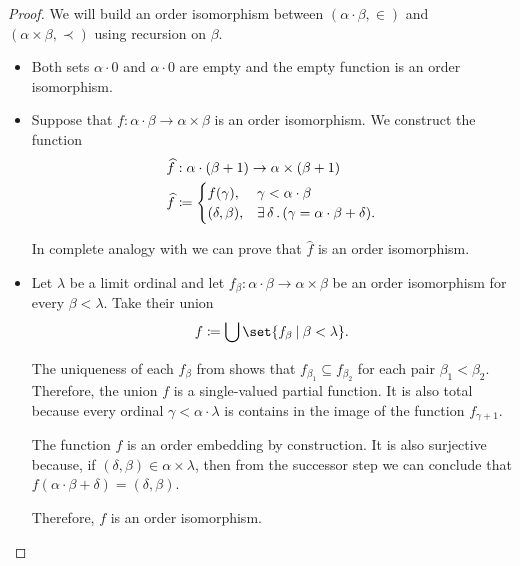 \begin{proof}
  We will build an order isomorphism between \( (\alpha \cdot \beta, \in) \) and \( (\alpha \times \beta, \prec) \) using recursion on \( \beta \).
  \begin{itemize}
    \item Both sets \( \alpha \cdot 0 \) and \( \alpha \cdot 0 \) are empty and the empty function is an order isomorphism.
    \item Suppose that \( f: \alpha \cdot \beta \to \alpha \times \beta \) is an order isomorphism. We construct the function
    \begin{equation*}
      \begin{aligned}
        &\widehat f: \alpha \cdot (\beta + 1) \to \alpha \times (\beta + 1) \\
        &\widehat f \coloneqq \begin{cases}
          f(\gamma),       &\gamma < \alpha \cdot \beta \\
          (\delta, \beta), &\exists \thinspace \delta \thinspace . \thinspace (\gamma = \alpha \cdot \beta + \delta).
        \end{cases}
      \end{aligned}
    \end{equation*}

    In complete analogy with  we can prove that \( \widehat f \) is an order isomorphism.

    \item Let \( \lambda \) be a limit ordinal and let \( f_\beta: \alpha \cdot \beta \to \alpha \times \beta \) be an order isomorphism for every \( \beta < \lambda \). Take their union
    \begin{equation*}
      f \coloneqq \bigcup\set{ f_\beta \given \beta < \lambda }.
    \end{equation*}

    The uniqueness of each \( f_\beta \) from  shows that \( f_{\beta_1} \subseteq f_{\beta_2} \) for each pair \( \beta_1 < \beta_2 \). Therefore, the union \( f \) is a single-valued partial function. It is also total because every ordinal \( \gamma < \alpha \cdot \lambda \) is contains in the image of the function \( f_{\gamma + 1} \).

    The function \( f \) is an order embedding by construction. It is also surjective because, if \( (\delta, \beta) \in \alpha \times \lambda \), then from the successor step we can conclude that \( f(\alpha \cdot \beta + \delta) = (\delta, \beta) \).

    Therefore, \( f \) is an order isomorphism.
  \end{itemize}
\end{proof}

